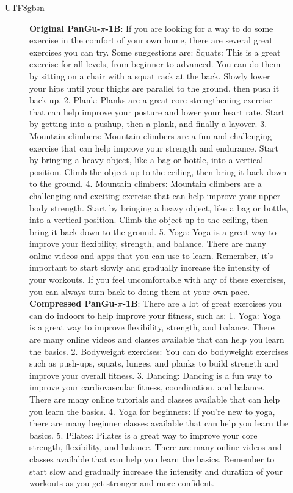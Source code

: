 \documentclass{article}
\theoremstyle{plain}
\theoremstyle{definition}
\theoremstyle{remark}
\begin{document}
\begin{CJK}{UTF8}{gbsn}
\begin{figure}[th]
\begin{center}
\begin{tcolorbox}[colback=gray!10,%
		colframe=black,%
		width=16cm,%
		arc=1mm, auto outer arc,
		boxrule=0.8pt,
		]
\textbf{Original PanGu-$\pi$-1B}: If you are looking for a way to do some exercise in the comfort of your own home, there are several great exercises you can try. Some suggestions are:
Squats: This is a great exercise for all levels, from beginner to advanced. You can do them by sitting on a chair with a squat rack at the back. Slowly lower your hips until your thighs are parallel to the ground, then push it back up. 2. Plank: Planks are a great core-strengthening exercise that can help improve your posture and lower your heart rate. Start by getting into a pushup, then a plank, and finally a layover. 3. Mountain climbers: Mountain climbers are a fun and challenging exercise that can help improve your strength and endurance. Start by bringing a heavy object, like a bag or bottle, into a vertical position. Climb the object up to the ceiling, then bring it back down to the ground. 4. Mountain climbers: Mountain climbers are a challenging and exciting exercise that can help improve your upper body strength. Start by bringing a heavy object, like a bag or bottle, into a vertical position. Climb the object up to the ceiling, then bring it back down to the ground. 5. Yoga: Yoga is a great way to improve your flexibility, strength, and balance. There are many online videos and apps that you can use to learn. Remember, it's important to start slowly and gradually increase the intensity of your workouts. If you feel uncomfortable with any of these exercises, you can always turn back to doing them at your own pace.\\

\textbf{Compressed PanGu-$\pi$-1B}: There are a lot of great exercises you can do indoors to help improve your fitness, such as:
1. Yoga: Yoga is a great way to improve flexibility, strength, and balance. There are many online videos and classes available that can help you learn the basics. 2. Bodyweight exercises: You can do bodyweight exercises such as push-ups, squats, lunges, and planks to build strength and improve your overall fitness. 3. Dancing: Dancing is a fun way to improve your cardiovascular fitness, coordination, and balance. There are many online tutorials and classes available that can help you learn the basics. 4. Yoga for beginners: If you're new to yoga, there are many beginner classes available that can help you learn the basics. 5. Pilates: Pilates is a great way to improve your core strength, flexibility, and balance. There are many online videos and classes available that can help you learn the basics. Remember to start slow and gradually increase the intensity and duration of your workouts as you get stronger and more confident.


\end{tcolorbox}
\end{center}
\end{figure}
\end{CJK}
\end{document}

